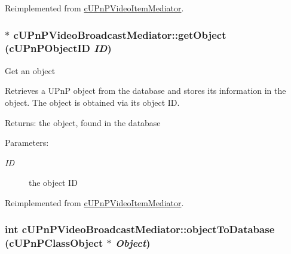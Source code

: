 Reimplemented from \hyperlink{classcUPnPVideoItemMediator_3f7ec1937b2b95e3ec5462470971d350}{cUPnPVideoItemMediator}.\hypertarget{classcUPnPVideoBroadcastMediator_c13bf0f008f49b0ab499542391998a24}{
\subsubsection[{getObject}]{ $\ast$ cUPnPVideoBroadcastMediator::getObject ({\bf cUPnPObjectID} {\em ID})}}
\label{classcUPnPVideoBroadcastMediator_c13bf0f008f49b0ab499542391998a24}


Get an object

Retrieves a UPnP object from the database and stores its information in the object. The object is obtained via its object ID.

\begin{Desc}
\item[Returns:]the object, found in the database \end{Desc}
\begin{Desc}
\item[Parameters:]
\begin{description}
\item[{\em ID}]the object ID \end{description}
\end{Desc}
  

Reimplemented from \hyperlink{classcUPnPVideoItemMediator_dd8927340a69d247965ef9250adefb21}{cUPnPVideoItemMediator}.\hypertarget{classcUPnPVideoBroadcastMediator_822f9c93928a7dbe9491c8cccbf53f95}{
\subsubsection[{objectToDatabase}]{\setlength{\rightskip}{0pt plus 5cm}int cUPnPVideoBroadcastMediator::objectToDatabase ({\bf cUPnPClassObject} $\ast$ {\em Object})}}
\label{classcUPnPVideoBroadcastMediator_822f9c93928a7dbe9491c8cccbf53f95}


